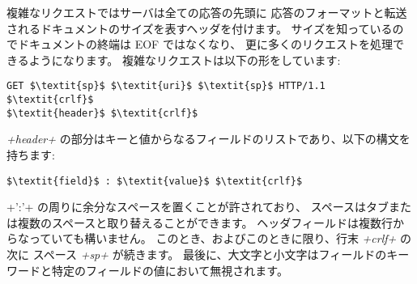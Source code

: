 複雑なリクエストではサーバは全ての応答の先頭に
応答のフォーマットと転送されるドキュメントのサイズを表すヘッダを付けます。
サイズを知っているのでドキュメントの終端は EOF ではなくなり、
更に多くのリクエストを処理できるようになります。
複雑なリクエストは以下の形をしています:
%
\begin{lstlisting}
GET $\textit{sp}$ $\textit{uri}$ $\textit{sp}$ HTTP/1.1 $\textit{crlf}$
$\textit{header}$ $\textit{crlf}$
\end{lstlisting}
%
\textit{\ml+header+} の部分はキーと値からなるフィールドのリストであり、以下の構文を持ちます:
%
\begin{lstlisting}
$\textit{field}$ : $\textit{value}$ $\textit{crlf}$
\end{lstlisting}
%
\ml+':'+ の周りに余分なスペースを置くことが許されており、
スペースはタブまたは複数のスペースと取り替えることができます。
ヘッダフィールドは複数行からなっていても構いません。
このとき、およびこのときに限り、行末 \textit {\ml+crlf+} の次に
スペース \textit{\ml+sp+} が続きます。
最後に、大文字と小文字はフィールドのキーワードと特定のフィールドの値において無視されます。

